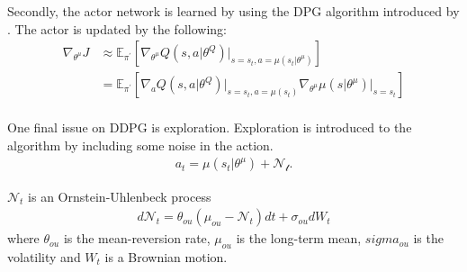 \documentclass[12pt,twoside]{article}
\begin{document}
Secondly, the actor network is learned by using the DPG algorithm introduced by \cite{silver2014deterministic}. The actor is updated by the following:
\begin{align*}
	\nabla_{\theta^\mu} J & \approx \mathbb{E}_{\pi^\prime}\left[\nabla_{\theta^\mu}Q(s,a\vert \theta^Q)\vert_{s=s_t, a=\mu(s_t\vert\theta^\mu)}\right]\\
	& = \mathbb{E}_{\pi^\prime}\left[\nabla_a Q(s,a\vert \theta^Q)\vert_{s=s_t, a=\mu(s_t)}\nabla_{\theta^\mu} \mu(s\vert \theta^\mu)\vert_{s=s_t}\right]\\
\end{align*}

One final issue on DDPG is exploration. Exploration is introduced to the algorithm by including some noise in the action.
\begin{align*}
	a_t = \mu(s_t\vert \theta^\mu) + \mathcal{N_t}.
\end{align*}

$\mathcal{N}_t $ is an Ornstein-Uhlenbeck process
\begin{align*}
	d\mathcal{N}_t = \theta_{ou}(\mu_{ou} - \mathcal{N}_t)dt + \sigma_{ou} dW_t
\end{align*}
where
$\theta_{ou}$ is the mean-reversion rate, $\mu_{ou}$ is the long-term mean, $sigma_{ou}$ is the volatility and  $W_t$ is a Brownian motion.


\newpage
\end{document}
